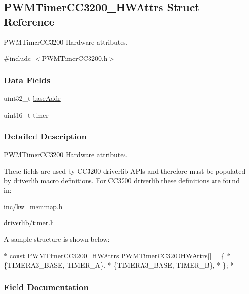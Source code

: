 \subsection{P\-W\-M\-Timer\-C\-C3200\-\_\-\-H\-W\-Attrs Struct Reference}
\label{struct_p_w_m_timer_c_c3200___h_w_attrs}


P\-W\-M\-Timer\-C\-C3200 Hardware attributes.  




{\ttfamily \#include $<$P\-W\-M\-Timer\-C\-C3200.\-h$>$}

\subsubsection*{Data Fields}
\begin{DoxyCompactItemize}
\item 
uint32\-\_\-t \hyperlink{struct_p_w_m_timer_c_c3200___h_w_attrs_a2cc366b46e3f710f761ad990afa1aea0}{base\-Addr}
\item 
uint16\-\_\-t \hyperlink{struct_p_w_m_timer_c_c3200___h_w_attrs_aa25fe5589d4a5c924759293c334fb40d}{timer}
\end{DoxyCompactItemize}


\subsubsection{Detailed Description}
P\-W\-M\-Timer\-C\-C3200 Hardware attributes. 

These fields are used by C\-C3200 driverlib A\-P\-Is and therefore must be populated by driverlib macro definitions. For C\-C3200 driverlib these definitions are found in\-:
\begin{DoxyItemize}
\item inc/hw\-\_\-memmap.\-h
\item driverlib/timer.\-h
\end{DoxyItemize}

A sample structure is shown below\-: 
\begin{DoxyCode}
*  \textcolor{keyword}{const} PWMTimerCC3200_HWAttrs PWMTimerCC3200HWAttrs[] = \{
*      \{TIMERA3\_BASE, TIMER\_A\},
*      \{TIMERA3\_BASE, TIMER\_B\},
*  \};
*  
\end{DoxyCode}
 

\subsubsection{Field Documentation}
